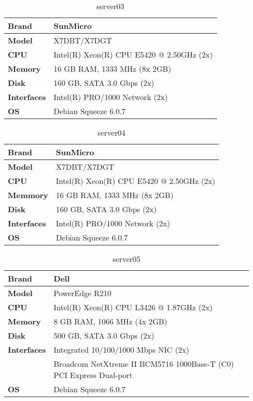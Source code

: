 \documentclass[Configuration]{subfiles}
\begin{document}
\begin{table}[h]
\caption{server03}
\centering
\begin{tabular}{|p{2cm}|p{9cm}|}
\hline
\textbf{Brand} & SunMicro \\ \hline
\textbf{Model} & X7DBT/X7DGT \\ \hline
\textbf{CPU} & Intel(R) Xeon(R) CPU E5420 @ 2.50GHz (2x)\\ \hline
\textbf{Memory} & 16 GB RAM, 1333 MHz (8x 2GB) \\ \hline
\textbf{Disk} & 160 GB, SATA 3.0 Gbps (2x)\\ \hline
\textbf{Interfaces} &   Intel(R) PRO/1000 Network (2x) \\ \hline
\textbf{OS} & Debian Squeeze 6.0.7 \\ \hline
\end{tabular}
\end{table}

\begin{table}[h]
\caption{server04}
\centering
\begin{tabular}{|p{2cm}|p{9cm}|}
\hline
\textbf{Brand} & SunMicro \\ \hline
\textbf{Model} & X7DBT/X7DGT \\ \hline
\textbf{CPU} & Intel(R) Xeon(R) CPU E5420 @ 2.50GHz (2x)\\ \hline
\textbf{Memmory} & 16 GB RAM, 1333 MHz (8x 2GB) \\ \hline
\textbf{Disk} & 160 GB, SATA 3.0 Gbps (2x)\\ \hline
\textbf{Interfaces} &   Intel(R) PRO/1000 Network (2x) \\ \hline
\textbf{OS} & Debian Squeeze 6.0.7 \\ \hline
\end{tabular}
\end{table}

\begin{table}[h]
\caption{server05}
\centering
\begin{tabular}{|p{2cm}|p{9cm}|}
\hline
\textbf{Brand} & Dell \\ \hline
\textbf{Model} & PowerEdge R210 \\ \hline
\textbf{CPU} & Intel(R) Xeon(R) CPU L3426 @ 1.87GHz (2x)\\ \hline
\textbf{Memory} & 8 GB RAM, 1066 MHz (4x 2GB) \\ \hline
\textbf{Disk} & 500 GB, SATA 3.0 Gbps (2x)\\ \hline
\textbf{Interfaces} &  Integrated 10/100/1000 Mbps NIC (2x) \\ \hline
 & Broadcom NetXtreme II BCM5716 1000Base-T (C0) PCI Express Dual-port \\ \hline
\textbf{OS} & Debian Squeeze 6.0.7 \\ \hline
\end{tabular}
\end{table}
\end{document}
